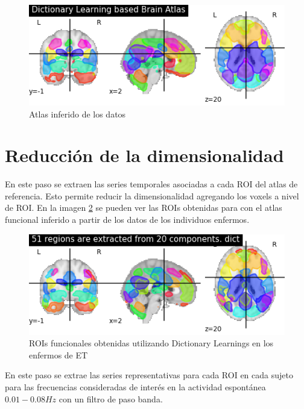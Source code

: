 \begin{figure}[H]
	\includegraphics[width=\linewidth, height=\textheight, keepaspectratio]{img/conectividad/dic_prob_atlas_et.png}
	\caption{Atlas inferido de los datos}
	\label{preproc:data_atlas}
\end{figure} 
  
\section{Reducción de la dimensionalidad}

En este paso se extraen las series temporales asociadas a cada ROI del atlas de referencia. Esto permite reducir la dimensionalidad agregando los voxels a nivel de ROI. En la imagen \ref{metod:rois} se pueden ver las ROIs obtenidas para con el atlas funcional inferido a partir de los datos de los individuos enfermos.

\begin{figure}[H]
	\includegraphics[width=\linewidth, height=\textheight, keepaspectratio]{img/conectividad/dic_rois_et.png}
	\caption{ROIs funcionales obtenidas utilizando Dictionary Learnings en los enfermos de ET}	\label{metod:rois}
\end{figure}

En este paso se extrae las series representativas para cada ROI en cada sujeto para las frecuencias consideradas de interés en la actividad espontánea $0.01-0.08 Hz$ con un filtro de paso banda.\cite{regions}

